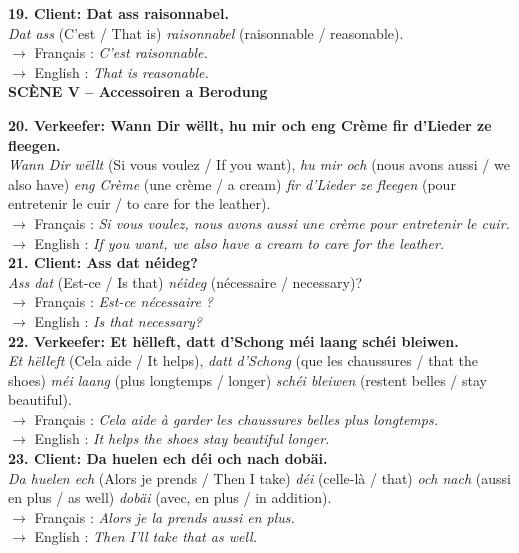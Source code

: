 \noindent\textbf{19. Client: Dat ass raisonnabel.}\\
\textit{Dat ass} (C'est / That is) \textit{raisonnabel} (raisonnable / reasonable).\\
$\rightarrow$ Français : \textit{C'est raisonnable.}\\
$\rightarrow$ English : \textit{That is reasonable.}\\[0.5em]

\noindent\textbf{SCÈNE V -- Accessoiren a Berodung}

\noindent\textbf{20. Verkeefer: Wann Dir wëllt, hu mir och eng Crème fir d'Lieder ze fleegen.}\\
\textit{Wann Dir wëllt} (Si vous voulez / If you want), \textit{hu mir och} (nous avons aussi / we also have) \textit{eng Crème} (une crème / a cream) \textit{fir d'Lieder ze fleegen} (pour entretenir le cuir / to care for the leather).\\
$\rightarrow$ Français : \textit{Si vous voulez, nous avons aussi une crème pour entretenir le cuir.}\\
$\rightarrow$ English : \textit{If you want, we also have a cream to care for the leather.}\\[0.5em]

\noindent\textbf{21. Client: Ass dat néideg?}\\
\textit{Ass dat} (Est-ce / Is that) \textit{néideg} (nécessaire / necessary)?\\
$\rightarrow$ Français : \textit{Est-ce nécessaire ?}\\
$\rightarrow$ English : \textit{Is that necessary?}\\[0.5em]

\noindent\textbf{22. Verkeefer: Et hëlleft, datt d'Schong méi laang schéi bleiwen.}\\
\textit{Et hëlleft} (Cela aide / It helps), \textit{datt d'Schong} (que les chaussures / that the shoes) \textit{méi laang} (plus longtemps / longer) \textit{schéi bleiwen} (restent belles / stay beautiful).\\
$\rightarrow$ Français : \textit{Cela aide à garder les chaussures belles plus longtemps.}\\
$\rightarrow$ English : \textit{It helps the shoes stay beautiful longer.}\\[0.5em]

\noindent\textbf{23. Client: Da huelen ech déi och nach dobäi.}\\
\textit{Da huelen ech} (Alors je prends / Then I take) \textit{déi} (celle-là / that) \textit{och nach} (aussi en plus / as well) \textit{dobäi} (avec, en plus / in addition).\\
$\rightarrow$ Français : \textit{Alors je la prends aussi en plus.}\\
$\rightarrow$ English : \textit{Then I'll take that as well.}\\[0.5em]

